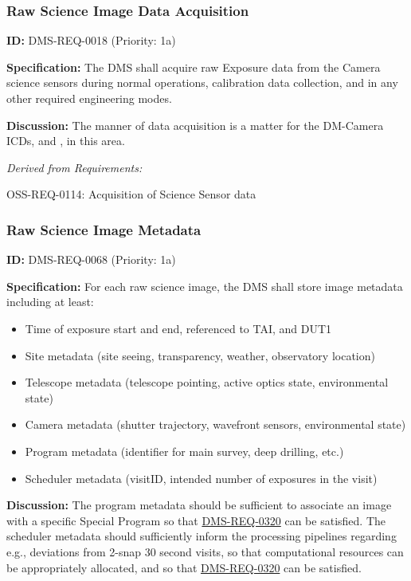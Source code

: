 \documentclass[SE,toc,lsstdraft]{lsstdoc}
\begin{document}
\subsubsection{Raw Science Image Data Acquisition}

\label{DMS-REQ-0018}
\textbf{ID:} DMS-REQ-0018 (Priority: 1a)

\textbf{Specification:} The DMS shall acquire raw Exposure data from the Camera science sensors during normal operations, calibration data collection, and in any other required engineering modes.

\textbf{Discussion:} The manner of data acquisition is a matter for the DM-Camera ICDs,  and , in this area.

\emph{Derived from Requirements:}

OSS-REQ-0114:
Acquisition of Science Sensor data \newline

\subsubsection{Raw Science Image Metadata}

\label{DMS-REQ-0068}
\textbf{ID:} DMS-REQ-0068 (Priority: 1a)

\textbf{Specification:}
For each raw science image, the DMS shall store image metadata including at least:

    \begin{itemize}
\item
Time of exposure start and end, referenced to TAI, and DUT1

\item
Site metadata (site seeing, transparency, weather, observatory location)

\item
Telescope metadata (telescope pointing, active optics state, environmental state)

\item
Camera metadata (shutter trajectory, wavefront sensors, environmental state)

\item
Program metadata (identifier for main survey, deep drilling, etc.)

\item
Scheduler metadata (visitID, intended number of exposures in the visit)

    \end{itemize}

\textbf{Discussion:}
The program metadata should be sufficient to associate an image with a specific Special Program so that \hyperref[DMS-REQ-0320]{DMS-REQ-0320} can be satisfied. The scheduler metadata should sufficiently inform the processing pipelines regarding e.g., deviations from 2-snap 30 second visits, so that computational resources can be appropriately allocated, and so that \hyperref[DMS-REQ-0320]{DMS-REQ-0320} can be satisfied.
\end{document}
